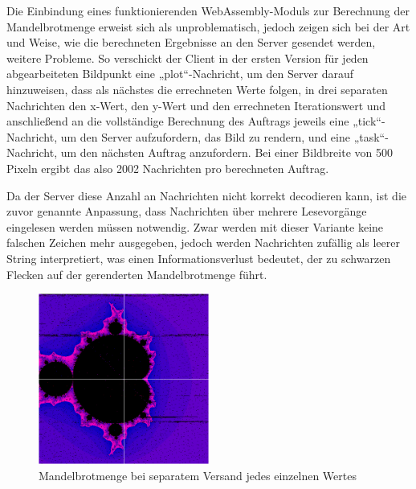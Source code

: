 \documentclass[12pt, onecolumn, notitlepage]{scrartcl}
\begin{document}
Die Einbindung eines funktionierenden WebAssembly-Moduls zur Berechnung der Mandelbrotmenge erweist sich als unproblematisch, jedoch zeigen sich bei der Art und Weise, wie die berechneten Ergebnisse an den Server gesendet werden, weitere Probleme. So verschickt der Client in der ersten Version für jeden abgearbeiteten Bildpunkt eine „plot“-Nachricht, um den Server darauf hinzuweisen, dass als nächstes die errechneten Werte folgen, in drei separaten Nachrichten den x-Wert, den y-Wert und den errechneten Iterationswert und anschließend an die vollständige Berechnung des Auftrags jeweils eine „tick“-Nachricht, um den Server aufzufordern, das Bild zu rendern, und eine „task“-Nachricht, um den nächsten Auftrag anzufordern. Bei einer Bildbreite von 500 Pixeln ergibt das also 2002 Nachrichten pro berechneten Auftrag. \par

Da der Server diese Anzahl an Nachrichten nicht korrekt decodieren kann, ist die zuvor genannte Anpassung, dass Nachrichten über mehrere Lesevorgänge eingelesen werden müssen notwendig. Zwar werden mit dieser Variante keine falschen Zeichen mehr ausgegeben, jedoch werden Nachrichten zufällig als leerer String interpretiert, was einen Informationsverlust bedeutet, der zu schwarzen Flecken auf der gerenderten Mandelbrotmenge führt. \par

\begin{figure}[htbp] 
	\centering
	\includegraphics[width=0.5\textwidth]{einzelnVersandt.PNG}
	\caption{Mandelbrotmenge bei separatem Versand jedes einzelnen Wertes}
	\label{fig:Bild1}
\end{figure}
\end{document}
